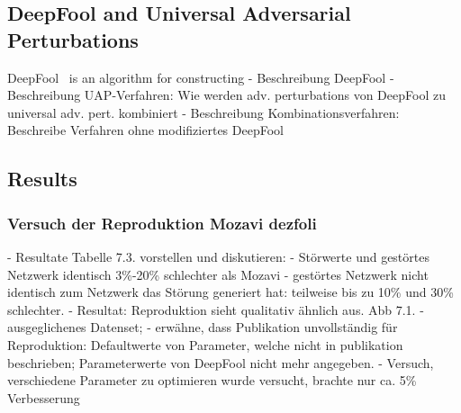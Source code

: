 \documentclass[runningheads]{llncs}
\begin{document}
\subsection{DeepFool and Universal Adversarial Perturbations}
DeepFool~\cite{DeepFool-Moosavi-Dezfooli15} is an algorithm for constructing
- Beschreibung DeepFool
- Beschreibung UAP-Verfahren: Wie werden adv. perturbations von DeepFool zu universal adv. pert. kombiniert
- Beschreibung Kombinationsverfahren: Beschreibe Verfahren ohne modifiziertes DeepFool
\subsection{Results}
\subsubsection{Versuch der Reproduktion Mozavi dezfoli}
		- Resultate Tabelle 7.3. vorstellen und diskutieren:
			- Störwerte und gestörtes Netzwerk identisch 3\%-20\% schlechter als Mozavi
			- gestörtes Netzwerk nicht identisch zum Netzwerk das Störung generiert hat: teilweise bis zu 10\% und 30\% schlechter. 
		- Resultat: Reproduktion sieht qualitativ ähnlich aus. Abb 7.1.
		- ausgeglichenes Datenset; 
		- erwähne, dass Publikation unvollständig für Reproduktion: Defaultwerte von Parameter, welche nicht in publikation beschrieben; Parameterwerte von DeepFool nicht mehr angegeben.
		- Versuch, verschiedene Parameter zu optimieren wurde versucht, brachte nur ca. 5\% Verbesserung
\end{document}
